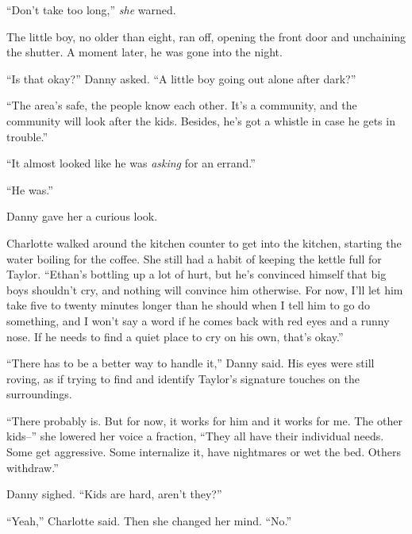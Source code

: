 ``Don't take too long,'' \emph{she} warned.



The little boy, no older than eight, ran off, opening the front door and unchaining the shutter.  A moment later, he was gone into the night.



``Is that okay?'' Danny asked.  ``A little boy going out alone after dark?''



``The area's safe, the people know each other.  It's a community, and the community will look after the kids.  Besides, he's got a whistle in case he gets in trouble.''



``It almost looked like he was \emph{asking} for an errand.''



``He was.''



Danny gave her a curious look.



Charlotte walked around the kitchen counter to get into the kitchen, starting the water boiling for the coffee.  She still had a habit of keeping the kettle full for Taylor.  ``Ethan's bottling up a lot of hurt, but he's convinced himself that big boys shouldn't cry, and nothing will convince him otherwise.  For now, I'll let him take five to twenty minutes longer than he should when I tell him to go do something, and I won't say a word if he comes back with red eyes and a runny nose.  If he needs to find a quiet place to cry on his own, that's okay.''



``There has to be a better way to handle it,'' Danny said.  His eyes were still roving, as if trying to find and identify Taylor's signature touches on the surroundings.



``There probably is.  But for now, it works for him and it works for me.  The other kids--'' she lowered her voice a fraction, ``They all have their individual needs.  Some get aggressive.  Some internalize it, have nightmares or wet the bed.  Others withdraw.''



Danny sighed.  ``Kids are hard, aren't they?''



``Yeah,'' Charlotte said.  Then she changed her mind.  ``No.''



